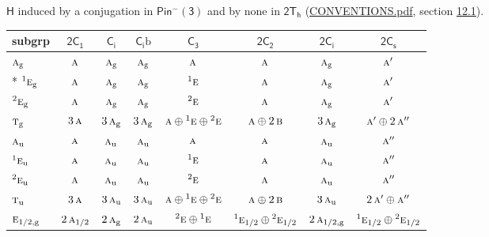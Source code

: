 \documentclass[10pt,a4paper]{article}
\numberwithin{equation}{section}
\newcommand{\grp}[1]{\mathsf{#1}}
\newcommand{\irr}[1]{\text{\normalfont\scshape #1}}
\newcommand{\conjpair}[1]{{}^{#1}}
\newcommand{\ptag}[1]{\mathrm{#1}}
\newcommand{\secondclass}{\mathrm{b}}
\begin{document}
$\grp{H}$ induced by a conjugation in \href{Pinminus3.pdf}{$\grp{Pin^{-}(3)}$} and by none in $\grp{2T_{h}}$ (\href{../../CONVENTIONS.pdf}{CONVENTIONS.pdf}, section \href{../../../rotation/CONVENTIONS.pdf\#conv.12.1}{12.1}).
{\small\begin{longtable}{@{}lccccccc@{}}\toprule
subgrp & \href{2C1.pdf}{$\grp{2C_{1}}$} & \href{S2.pdf}{$\grp{C_{i}}$} & \href{S2b.pdf}{$\grp{C_{i}}\secondclass$} & \href{C3.pdf}{$\grp{C_{3}}$} & \href{2C2.pdf}{$\grp{2C_{2}}$} & \href{2S2.pdf}{$\grp{2C_{i}}$} & \href{2C1v.pdf}{$\grp{2C_{s}}$}\\\midrule\endhead
\bottomrule\endfoot\endlastfoot
$\irr{a}_{\ptag{g}}$ & $\irr{a}$ & $\irr{a}_{\ptag{g}}$ & $\irr{a}_{\ptag{g}}$ & $\irr{a}$ & $\irr{a}$ & $\irr{a}_{\ptag{g}}$ & $\irr{a}'$\\*
$\conjpair{1}\irr{e}_{\ptag{g}}$ & $\irr{a}$ & $\irr{a}_{\ptag{g}}$ & $\irr{a}_{\ptag{g}}$ & $\conjpair{1}\irr{e}$ & $\irr{a}$ & $\irr{a}_{\ptag{g}}$ & $\irr{a}'$\\
$\conjpair{2}\irr{e}_{\ptag{g}}$ & $\irr{a}$ & $\irr{a}_{\ptag{g}}$ & $\irr{a}_{\ptag{g}}$ & $\conjpair{2}\irr{e}$ & $\irr{a}$ & $\irr{a}_{\ptag{g}}$ & $\irr{a}'$\\
$\irr{t}_{\ptag{g}}$ & $3\,\irr{a}$ & $3\,\irr{a}_{\ptag{g}}$ & $3\,\irr{a}_{\ptag{g}}$ & $\irr{a}\oplus \conjpair{1}\irr{e}\oplus \conjpair{2}\irr{e}$ & $\irr{a}\oplus 2\,\irr{b}$ & $3\,\irr{a}_{\ptag{g}}$ & $\irr{a}'\oplus 2\,\irr{a}''$\\
$\irr{a}_{\ptag{u}}$ & $\irr{a}$ & $\irr{a}_{\ptag{u}}$ & $\irr{a}_{\ptag{u}}$ & $\irr{a}$ & $\irr{a}$ & $\irr{a}_{\ptag{u}}$ & $\irr{a}''$\\
$\conjpair{1}\irr{e}_{\ptag{u}}$ & $\irr{a}$ & $\irr{a}_{\ptag{u}}$ & $\irr{a}_{\ptag{u}}$ & $\conjpair{1}\irr{e}$ & $\irr{a}$ & $\irr{a}_{\ptag{u}}$ & $\irr{a}''$\\
$\conjpair{2}\irr{e}_{\ptag{u}}$ & $\irr{a}$ & $\irr{a}_{\ptag{u}}$ & $\irr{a}_{\ptag{u}}$ & $\conjpair{2}\irr{e}$ & $\irr{a}$ & $\irr{a}_{\ptag{u}}$ & $\irr{a}''$\\
$\irr{t}_{\ptag{u}}$ & $3\,\irr{a}$ & $3\,\irr{a}_{\ptag{u}}$ & $3\,\irr{a}_{\ptag{u}}$ & $\irr{a}\oplus \conjpair{1}\irr{e}\oplus \conjpair{2}\irr{e}$ & $\irr{a}\oplus 2\,\irr{b}$ & $3\,\irr{a}_{\ptag{u}}$ & $2\,\irr{a}'\oplus \irr{a}''$\\
$\irr{e}_{1/2,\ptag{g}}$ & $2\,\irr{a}_{1/2}$ & $2\,\irr{a}_{\ptag{g}}$ & $2\,\irr{a}_{\ptag{u}}$ & $\conjpair{2}\irr{e}\oplus \conjpair{1}\irr{e}$ & $\conjpair{1}\irr{e}_{1/2}\oplus \conjpair{2}\irr{e}_{1/2}$ & $2\,\irr{a}_{1/2,\ptag{g}}$ & $\conjpair{1}\irr{e}_{1/2}\oplus \conjpair{2}\irr{e}_{1/2}$\\

\end{longtable}}
\end{document}
